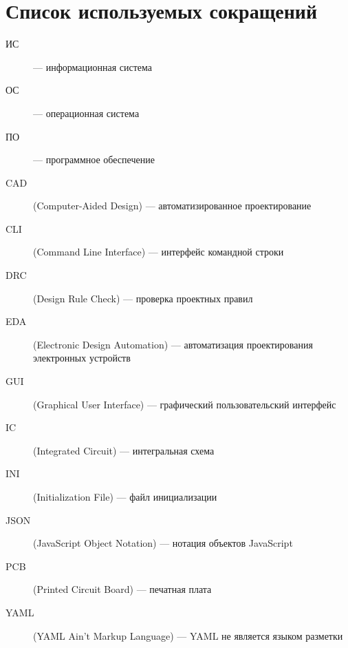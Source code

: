 \chapter*{Список используемых сокращений}

\begin{description}
	\item[ИС] --- информационная система
	\item[ОС] --- операционная система
	\item[ПО] --- программное обеспечение
	\item[CAD] (Computer-Aided Design) --- автоматизированное проектирование
	\item[CLI] (Command Line Interface) --- интерфейс командной строки
	\item[DRC] (Design Rule Check) --- проверка проектных правил
	\item[EDA] (Electronic Design Automation)
		--- автоматизация проектирования электронных устройств
	\item[GUI] (Graphical User Interface)
		--- графический пользовательский интерфейс
	\item[IC] (Integrated Circuit) --- интегральная схема
	\item[INI] (Initialization File) --- файл инициализации
	\item[JSON] (JavaScript Object Notation) --- нотация объектов JavaScript
	\item[PCB] (Printed Circuit Board) --- печатная плата
	\item[YAML] (YAML Ain't Markup Language)
		--- YAML не является языком разметки
\end{description}

